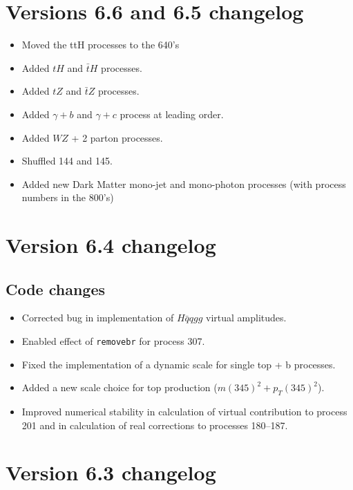 \documentclass[12pt]{article}
\begin{document}
\section{Versions 6.6 and 6.5 changelog}
\label{changelog6.5}
\begin{itemize}
\item Moved the ttH processes to the 640's
\item Added $tH$ and $\bar{t}H$  processes.
\item Added $tZ$ and $\bar{t}Z$  processes.
\item Added $\gamma+b$ and $\gamma+c$ process at leading order.
\item Added $W Z $ + 2 parton processes.
\item Shuffled 144 and 145.
\item Added new Dark Matter mono-jet and mono-photon processes (with process numbers in the 800's) 
\end{itemize}

\section{Version 6.4 changelog}
\label{changelog6.4}

\subsection{Code changes}
\begin{itemize}
\item Corrected bug in implementation of $H\bar q q gg$ virtual amplitudes.
\item Enabled effect of {\tt removebr} for process 307.
\item Fixed the implementation of a dynamic scale for single top + b processes.
\item Added a new scale choice for top production ($m(345)^2+p_T(345)^2$).
\item Improved numerical stability in calculation of virtual contribution to process
201 and in calculation of real corrections to processes 180--187.  
\end{itemize}

\section{Version 6.3 changelog}
\label{changelog6.3}
\end{document}
